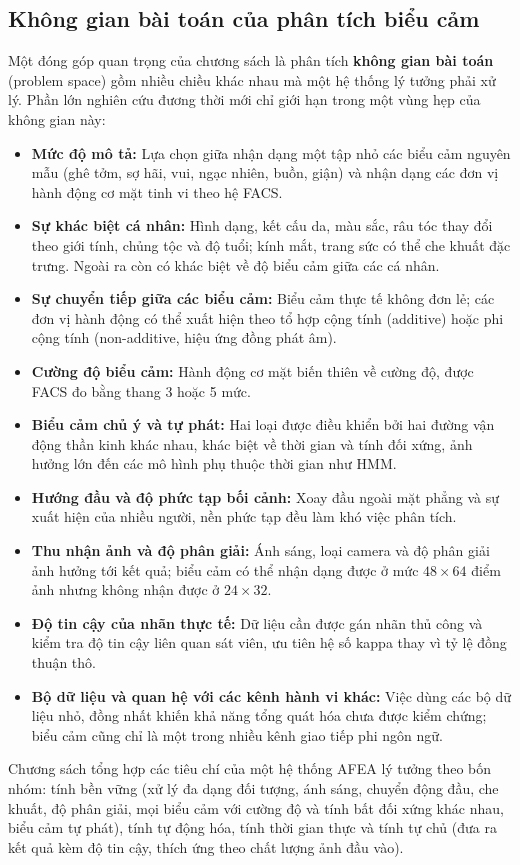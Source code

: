 \subsection{Không gian bài toán của phân tích biểu cảm}
Một đóng góp quan trọng của chương sách là phân tích \textbf{không gian bài toán} (problem space) gồm nhiều chiều khác nhau mà một hệ thống lý tưởng phải xử lý. Phần lớn nghiên cứu đương thời mới chỉ giới hạn trong một vùng hẹp của không gian này:
\begin{itemize}
    \item \textbf{Mức độ mô tả:} Lựa chọn giữa nhận dạng một tập nhỏ các biểu cảm nguyên mẫu (ghê tởm, sợ hãi, vui, ngạc nhiên, buồn, giận) và nhận dạng các đơn vị hành động cơ mặt tinh vi theo hệ FACS.
    \item \textbf{Sự khác biệt cá nhân:} Hình dạng, kết cấu da, màu sắc, râu tóc thay đổi theo giới tính, chủng tộc và độ tuổi; kính mắt, trang sức có thể che khuất đặc trưng. Ngoài ra còn có khác biệt về độ biểu cảm giữa các cá nhân.
    \item \textbf{Sự chuyển tiếp giữa các biểu cảm:} Biểu cảm thực tế không đơn lẻ; các đơn vị hành động có thể xuất hiện theo tổ hợp cộng tính (additive) hoặc phi cộng tính (non-additive, hiệu ứng đồng phát âm).
    \item \textbf{Cường độ biểu cảm:} Hành động cơ mặt biến thiên về cường độ, được FACS đo bằng thang 3 hoặc 5 mức.
    \item \textbf{Biểu cảm chủ ý và tự phát:} Hai loại được điều khiển bởi hai đường vận động thần kinh khác nhau, khác biệt về thời gian và tính đối xứng, ảnh hưởng lớn đến các mô hình phụ thuộc thời gian như HMM.
    \item \textbf{Hướng đầu và độ phức tạp bối cảnh:} Xoay đầu ngoài mặt phẳng và sự xuất hiện của nhiều người, nền phức tạp đều làm khó việc phân tích.
    \item \textbf{Thu nhận ảnh và độ phân giải:} Ánh sáng, loại camera và độ phân giải ảnh hưởng tới kết quả; biểu cảm có thể nhận dạng được ở mức $48 \times 64$ điểm ảnh nhưng không nhận được ở $24 \times 32$.
    \item \textbf{Độ tin cậy của nhãn thực tế:} Dữ liệu cần được gán nhãn thủ công và kiểm tra độ tin cậy liên quan sát viên, ưu tiên hệ số kappa thay vì tỷ lệ đồng thuận thô.
    \item \textbf{Bộ dữ liệu và quan hệ với các kênh hành vi khác:} Việc dùng các bộ dữ liệu nhỏ, đồng nhất khiến khả năng tổng quát hóa chưa được kiểm chứng; biểu cảm cũng chỉ là một trong nhiều kênh giao tiếp phi ngôn ngữ.
\end{itemize}
Chương sách tổng hợp các tiêu chí của một hệ thống AFEA lý tưởng theo bốn nhóm: tính bền vững (xử lý đa dạng đối tượng, ánh sáng, chuyển động đầu, che khuất, độ phân giải, mọi biểu cảm với cường độ và tính bất đối xứng khác nhau, biểu cảm tự phát), tính tự động hóa, tính thời gian thực và tính tự chủ (đưa ra kết quả kèm độ tin cậy, thích ứng theo chất lượng ảnh đầu vào).

